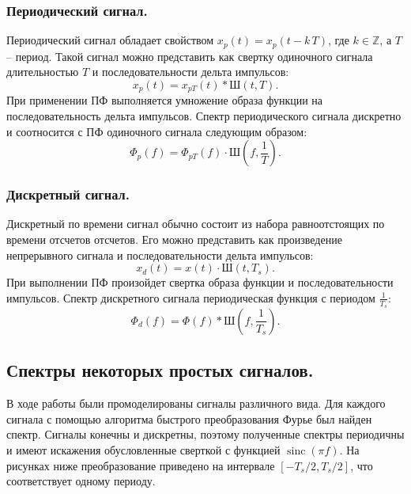 \documentclass[a4paper,14pt]{extarticle}
\DeclareMathOperator{\sinc}{sinc}
\begin{document}
\subsubsection{Периодический сигнал.}

Периодический сигнал обладает свойством $x_p(t) = x_p(t - k\,T)$, где $ k \in \mathbb{Z}$, а $T$ -- период. Такой сигнал можно представить как свертку одиночного сигнала длительностью $T$ и последовательности дельта импульсов:
\begin{equation*}
x_p(t) = x_{pT}(t) * \text{Ш}(t, T).
\end{equation*}
При применении ПФ выполняется умножение образа функции на последовательность дельта импульсов. Спектр периодического сигнала дискретно и соотносится с ПФ одиночного сигнала следующим образом:
\begin{equation*}
\Phi_p(f) = \Phi_{pT}(f) \cdot \text{Ш}(f, \frac{1}{T}).
\end{equation*}

\subsubsection{Дискретный сигнал.}

Дискретный по времени сигнал обычно состоит из набора равноотстоящих по времени отсчетов отсчетов. Его можно представить как произведение непрерывного сигнала и последовательности дельта импульсов:
\begin{equation*}
x_d(t) = x(t) \cdot \text{Ш}(t, T_s).
\end{equation*}
При выполнении ПФ произойдет свертка образа функции и последовательности импульсов. Спектр дискретного сигнала периодическая функция с периодом $\frac{1}{T_s}$:
\begin{equation*}
\Phi_d(f) = \Phi(f) * \text{Ш}(f, \frac{1}{T_s}).
\end{equation*}

\subsection{Спектры некоторых простых сигналов.}

В ходе работы были промоделированы сигналы различного вида. Для каждого сигнала с помощью алгоритма быстрого преобразования Фурье был найден спектр. Сигналы конечны и дискретны, поэтому полученные спектры периодичны и имеют искажения обусловленные сверткой с функцией $\sinc(\pi f)$. На рисунках ниже преобразование приведено на интервале $[-T_s / 2, T_s/2]$, что соответствует одному периоду.  
\end{document}
